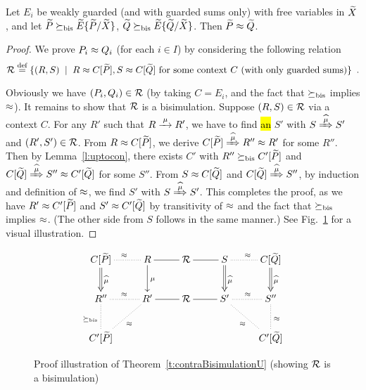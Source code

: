 \begin{theorem}
\label{t:contraBisimulationU} %
Let $E_i$ be weakly guarded (and with guarded sums only) with free
variables in $\widetilde X$, and let $\widetilde P \mathrel{\succeq_{\rm{bis}}} \widetilde E\{\widetilde P/\widetilde X\}$,
    $\widetilde Q \mathrel{\succeq_{\rm{bis}}} \widetilde E\{\widetilde Q/\widetilde X\}$. Then $\widetilde P \approx \widetilde Q$.
\end{theorem}

\begin{proof}
We  prove $P_i \approx Q_i$ (for each $i \in I$) by considering the following relation
\begin{equation*}
{\cal R} \stackrel{\mbox{\scriptsize def}}{=} \{(R,S) \; \mid \; R \approx C [\widetilde P], S \approx C [\widetilde Q] \mbox{~for some context
$C$ (with only guarded sums)} \} \enspace.
\end{equation*}

Obviously we have $(P_i,Q_i) \in {\cal R}$ (by taking $C = E_i$, and
the fact that $\mathrel{\succeq_{\rm{bis}}}$ implies $\approx$). It remains to
show that ${\cal R}$ is a bisimulation. Suppose $(R, S) \in {\cal R}$ via a context
$C$. For any $R'$ such that $R \arr{\mu} R'$, we have to find \hl{an} $S'$ with $S \Arcap{\mu}
S'$ and $(R', S') \in {\cal R}$. From $R \approx C[{\widetilde P}]$, we derive $C[{\til P}]
\Arcap{\mu} R'' \wb R'$ for some $R''$. Then by Lemma~\ref{l:uptocon},
there exists $C'$ with $R'' \mathrel{\succeq_{\rm{bis}}} C'[{\widetilde P}]$ and $C[{\til Q}]
\Arcap{\mu} S'' \wb C'[{\til Q}]$ for some $S''$. From $S \approx C[{\widetilde
  Q}]$ and $C[{\til Q}] \Arcap{\mu} S''$, by induction and definition of $\approx$, we find
 $S'$ with $S \Arcap{\mu} S'$. This completes the
proof, as we have $R' \approx C'[{\widetilde P}]$ and $S' \approx C'[{\widetilde Q}]$ by
transitivity of $\approx$ and the fact that $\mathrel{\succeq_{\rm{bis}}}$ implies $\approx$.
(The other side from $S$ follows in the same manner.)
See Fig.~\ref{fig:310} for a visual illustration.
\end{proof}

\begin{figure}[ht]
\begin{displaymath}
  \xymatrix{
    {C[{\til P}]} \ar@{.}[r]^{\wb} \ar@{=>}[d]^{\widehat{\mu}} & {R} \ar@{-}[r]
    \ar@{->}[d]^{\mu} & {\R} \ar@{-}[r] & {S} \ar@{.}[r]^{\wb}
    \ar@{=>}[d]^{\widehat{\mu}} & {C[{\til Q}]} \ar@{=>}[d]^{\widehat{\mu}} \\
    {R''} \ar@{.}[d]_{\mcontrBIS} \ar@{.}[r]^{\wb} & {R'} \ar@{-}[r]
    \ar@{.}[ld]^{\wb} & {\R} \ar@{-}[r] & {S'} \ar@{.}[r]^{\wb} \ar@{.}[rd]_{\wb}
    & {S''} \ar@{.}[d]^{\wb} \\
    {C'[{\til P}]} & {} & {} & {} & {C'[{\til Q}]}
  }
\end{displaymath}
\caption{Proof illustration of Theorem~\ref{t:contraBisimulationU}
  (showing ${\cal R}$ is a bisimulation)}
\label{fig:310}
\end{figure}

